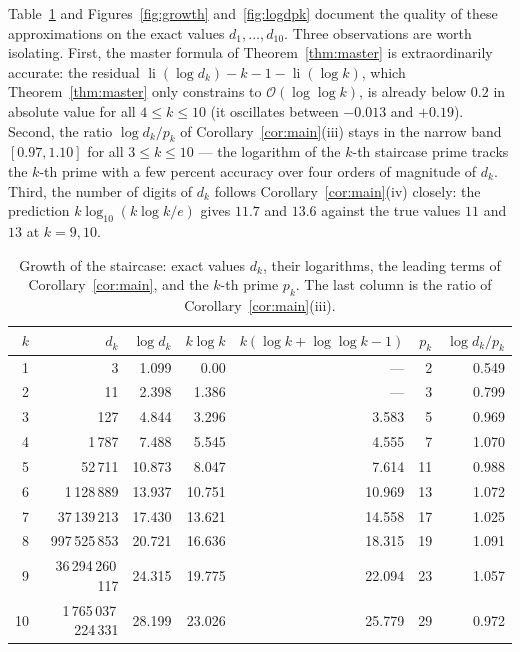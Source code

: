 \documentclass[11pt,a4paper]{article}
\theoremstyle{plain}
\theoremstyle{definition}
\newcommand{\li}{\operatorname{li}}
\begin{document}
Table~\ref{tab:growth} and Figures~\ref{fig:growth} and~\ref{fig:logdpk}
document the quality of these approximations on the exact values
$d_1,\ldots,d_{10}$. Three observations are worth isolating.
First, the master formula of Theorem~\ref{thm:master} is extraordinarily
accurate: the residual $\li(\log d_k)-k-1-\li(\log k)$, which
Theorem~\ref{thm:master} only constrains to $\mathcal{O}(\log\log k)$, is
already below $0.2$ in absolute value for all $4\le k\le10$
(it oscillates between $-0.013$ and $+0.19$).
Second, the ratio $\log d_k/p_k$ of Corollary~\ref{cor:main}(iii) stays in
the narrow band $[0.97,1.10]$ for all $3\le k\le10$ --- the logarithm of
the $k$-th staircase prime tracks the $k$-th prime with a few percent
accuracy over four orders of magnitude of $d_k$.
Third, the number of digits of $d_k$ follows
Corollary~\ref{cor:main}(iv) closely: the prediction
$k\log_{10}(k\log k/e)$ gives $11.7$ and $13.6$ against the true values
$11$ and $13$ at $k=9,10$.

\begin{table}[htbp]
\centering
\small
\caption{Growth of the staircase: exact values $d_k$, their logarithms, the
leading terms of Corollary~\ref{cor:main}, and the $k$-th prime $p_k$. The
last column is the ratio of Corollary~\ref{cor:main}(iii).}
\label{tab:growth}
\begin{tabular}{@{}rrrrrrr@{}}
\toprule
$k$ & $d_k$ & $\log d_k$ & $k\log k$ & $k(\log k+\log\log k-1)$ & $p_k$ &
$\log d_k/p_k$\\
\midrule
1 & 3 & 1.099 & 0.00 & --- & 2 & 0.549\\
2 & 11 & 2.398 & 1.386 & --- & 3 & 0.799\\
3 & 127 & 4.844 & 3.296 & 3.583 & 5 & 0.969\\
4 & 1\,787 & 7.488 & 5.545 & 4.555 & 7 & 1.070\\
5 & 52\,711 & 10.873 & 8.047 & 7.614 & 11 & 0.988\\
6 & 1\,128\,889 & 13.937 & 10.751 & 10.969 & 13 & 1.072\\
7 & 37\,139\,213 & 17.430 & 13.621 & 14.558 & 17 & 1.025\\
8 & 997\,525\,853 & 20.721 & 16.636 & 18.315 & 19 & 1.091\\
9 & 36\,294\,260\,117 & 24.315 & 19.775 & 22.094 & 23 & 1.057\\
10 & 1\,765\,037\,224\,331 & 28.199 & 23.026 & 25.779 & 29 & 0.972\\
\bottomrule
\end{tabular}
\end{table}
\end{document}
